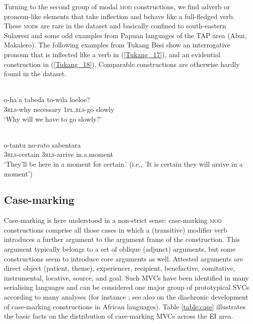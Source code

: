 Turning to the second group of modal \textsc{mod} constructions, we find adverb or pronoun-like elements that take inflection and behave like a full-fledged verb. These \textsc{mod}s are rare in the dataset and basically confined to south-eastern Sulawesi and some odd examples from Papuan languages of the TAP area (Abui, Makalero). The following examples from Tukang Besi show an interrogative pronoun that is inflected like a verb in (\ref{Tukang_17}), and an evidential construction in (\ref{Tukang_18}). Comparable constructions are otherwise hardly found in the dataset.

\ea \label{Tukang_17}
\\
\gll o-ha'a tabeda to-wila loeloe? \\
3\textsc{rls}-why necessary 1\textsc{pl}.\textsc{rls}-go slowly \\
\glft `Why will we have to go slowly?'\\ 
\z

\ea \label{Tukang_18}
\\
\gll o-tantu no-rato sabentara \\
3\textsc{rls}-certain 3\textsc{rls}-arrive in.a.moment \\
\glft `They'll be here in a moment for certain.' (i.e., 'It is certain they will arrive in a moment')\\ 
\z

\subsection{Case-marking} \label{sec:case-marking}

Case-marking is here understood in a non-strict sense: case-marking \textsc{mod} constructions comprise all those cases in which a (transitive) modifier verb introduces a further argument to the argument frame of the construction. This argument typically belongs to a set of oblique (adjunct) arguments, but some constructions seem to introduce core arguments as well. Attested arguments are direct object (patient, theme), experiencer, recipient, benefactive, comitative, instrumental, locative, source, and goal. Such MVCs have been identified in many serialising languages and can be considered one major group of prototypical SVCs according to many analyses (for instance \citealt{givon1991serial, Aikhenvald2006, haspelmath2016serial}; see also \citealt{lord1993historical} on the diachronic development of case-marking constructions in African languages). Table \ref{table:case} illustrates the basic facts on the distribution of case-marking MVCs across the EI area.

